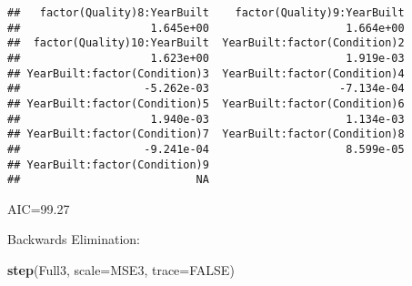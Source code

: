 \documentclass[
]{article}
\newenvironment{Shaded}{\begin{snugshade}}{\end{snugshade}}
\newcommand{\DataTypeTok}[1]{\textcolor[rgb]{0.13,0.29,0.53}{#1}}
\newcommand{\KeywordTok}[1]{\textcolor[rgb]{0.13,0.29,0.53}{\textbf{#1}}}
\newcommand{\NormalTok}[1]{#1}
\newcommand{\OtherTok}[1]{\textcolor[rgb]{0.56,0.35,0.01}{#1}}
\begin{document}
\begin{verbatim}
##   factor(Quality)8:YearBuilt    factor(Quality)9:YearBuilt  
##                    1.645e+00                     1.664e+00  
##  factor(Quality)10:YearBuilt  YearBuilt:factor(Condition)2  
##                    1.623e+00                     1.919e-03  
## YearBuilt:factor(Condition)3  YearBuilt:factor(Condition)4  
##                   -5.262e-03                    -7.134e-04  
## YearBuilt:factor(Condition)5  YearBuilt:factor(Condition)6  
##                    1.940e-03                     1.134e-03  
## YearBuilt:factor(Condition)7  YearBuilt:factor(Condition)8  
##                   -9.241e-04                     8.599e-05  
## YearBuilt:factor(Condition)9  
##                           NA
\end{verbatim}

AIC=99.27

Backwards Elimination:

\begin{Shaded}
\begin{Highlighting}[]
\KeywordTok{step}\NormalTok{(Full3, }\DataTypeTok{scale=}\NormalTok{MSE3, }\DataTypeTok{trace=}\OtherTok{FALSE}\NormalTok{)}
\end{Highlighting}
\end{Shaded}
\end{document}
